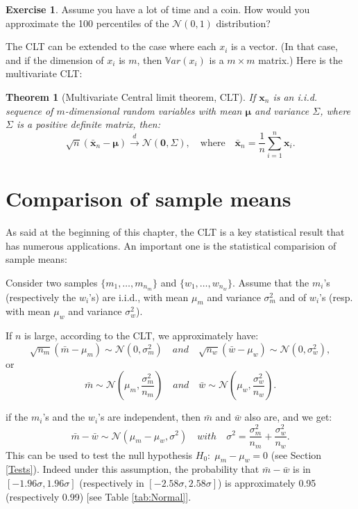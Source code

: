 \documentclass[
  12pt,
]{book}
\newtheorem{theorem}{Theorem}[chapter]
\theoremstyle{definition}
\theoremstyle{definition}
\theoremstyle{definition}
\newtheorem{exercise}{Exercise}[chapter]
\theoremstyle{definition}
\theoremstyle{remark}
\begin{document}
\begin{exercise}
\protect\hypertarget{exr:ExoPileFace}{}\label{exr:ExoPileFace}Assume you have a lot of time and a coin. How would you approximate the 100 percentiles of the \(\mathcal{N}(0,1)\) distribution?
\end{exercise}

The CLT can be extended to the case where each \(x_i\) is a vector. (In that case, and if the dimension of \(x_i\) is \(m\), then \(\mathbb{V}ar(x_i)\) is a \(m\times m\) matrix.) Here is the multivariate CLT:

\begin{theorem}[Multivariate Central limit theorem, CLT]
\protect\hypertarget{thm:MCLT}{}\label{thm:MCLT}If \(\mathbf{x}_n\) is an i.i.d. sequence of \(m\)-dimensional random variables with mean \(\boldsymbol\mu\) and variance \(\Sigma\), where \(\Sigma\) is a positive definite matrix, then:
\[
\boxed{\sqrt{n} (\bar{\mathbf{x}}_n - \boldsymbol\mu) \overset{d}{\rightarrow} \mathcal{N}(\mathbf{0},\Sigma), \quad \mbox{where} \quad \bar{\mathbf{x}}_n = \frac{1}{n} \sum_{i=1}^{n} \mathbf{x}_i.}
\]
\end{theorem}

\hypertarget{comparison-of-sample-means}{%
\section{Comparison of sample means}\label{comparison-of-sample-means}}

As said at the beginning of this chapter, the CLT is a key statistical result that has numerous applications. An important one is the statistical comparision of sample means:

Consider two samples \(\{m_1,\dots,m_{n_m}\}\) and \(\{w_1,\dots,w_{n_w}\}\). Assume that the \(m_i\)'s (respectively the \(w_i\)'s) are i.i.d., with mean \(\mu_m\) and variance \(\sigma^2_m\) and of \(w_i\)'s (resp. with mean \(\mu_w\) and variance \(\sigma^2_w\)).

If \(n\) is large, according to the CLT, we approximately have:
\[
\sqrt{n_m}(\bar{m} - \mu_m) \sim \mathcal{N}(0,\sigma^2_m) \quad and \quad \sqrt{n_w}(\bar{w} - \mu_w) \sim \mathcal{N}(0,\sigma^2_w),
\]
or
\[
\bar{m} \sim \mathcal{N}\left(\mu_m,\frac{\sigma^2_m}{n_m}\right) \quad and \quad \bar{w} \sim \mathcal{N}\left(\mu_w,\frac{\sigma^2_w}{n_w}\right).
\]

if the \(m_i\)'s and the \(w_i\)'s are independent, then \(\bar{m}\) and \(\bar{w}\) also are, and we get:
\[
\bar{m} - \bar{w} \sim \mathcal{N}\left(\mu_m-\mu_w,\sigma^2\right) \quad with \quad \sigma^2 = \frac{\sigma^2_m}{n_m}+\frac{\sigma^2_w}{n_w}.
\]
This can be used to test the null hypothesis \(H_0: \; \mu_m-\mu_w = 0\) (see Section \ref{Tests}). Indeed under this assumption, the probability that \(\bar{m} - \bar{w}\) is in \([-1.96\sigma,1.96\sigma]\) (respectively in \([-2.58\sigma,2.58\sigma]\)) is approximately 0.95 (respectively 0.99) {[}see Table \ref{tab:Normal}{]}.
\end{document}
